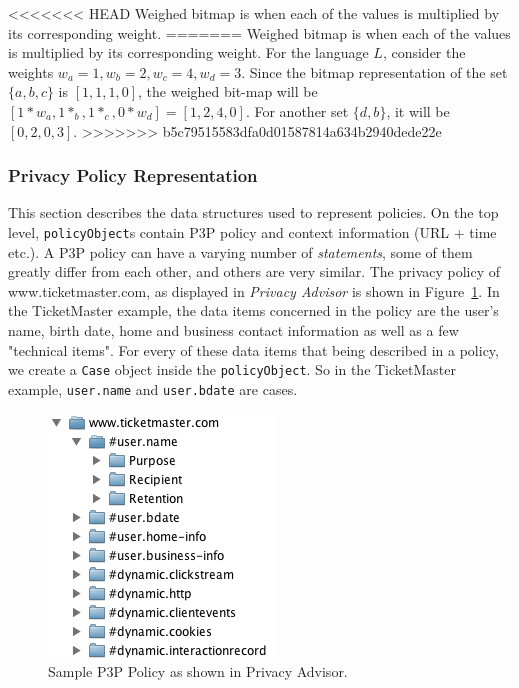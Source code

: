 <<<<<<< HEAD
Weighed bitmap is when each of the values is multiplied by its corresponding weight.
=======
Weighed bitmap is when each of the values is multiplied by its corresponding weight. For the language $L$, consider the weights $w_a=1, w_b=2, w_c=4, w_d=3$. Since the bitmap representation of the set $\{a,b,c\}$ is $[1, 1, 1, 0]$, the weighed bit-map will be $[1*w_a, 1*_b, 1*_c, 0*w_d]=[1, 2, 4, 0]$. For another set $\{d,b\}$, it will be $[0, 2, 0, 3]$.
>>>>>>> b5c79515583dfa0d01587814a634b2940dede22e

\subsubsection{Privacy Policy Representation}

This section describes the data structures used to represent policies. On the top level, \texttt{policyObject}s contain P3P policy and context information (URL + time etc.). A P3P policy can have a varying number of \emph{statements}, some of them greatly differ from each other, and others are very similar. The privacy policy of www.ticketmaster.com, as displayed in \emph{Privacy Advisor} is shown in Figure~\ref{p3pPol}. In the TicketMaster example, the data items concerned in the policy are the user's name, birth date, home and business contact information as well as a few "technical items". For every of these data items that being described in a policy, we create a \texttt{Case} object inside the \texttt{policyObject}. So in the TicketMaster example, \texttt{user.name} and \texttt{user.bdate} are cases.

\begin{figure}[htbp]
\begin{center}
\includegraphics{Implementation/p3p_pol}
\caption{Sample P3P Policy as shown in Privacy Advisor.}
\label{p3pPol}
\end{center}
\end{figure}

